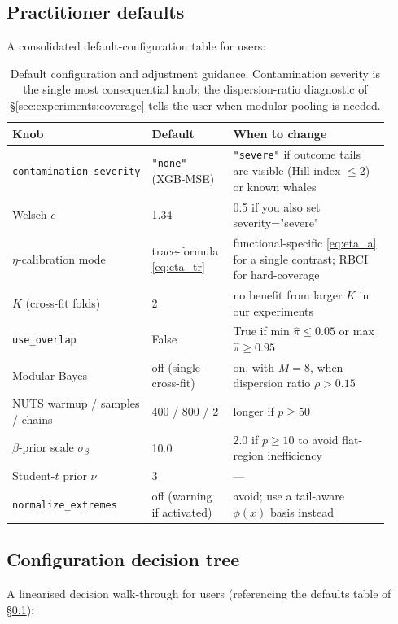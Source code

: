 \subsection{Practitioner defaults}
\label{sec:discussion:defaults}
A consolidated default-configuration table for users:

\begin{table}[!t]
\centering
\small
\begin{tabular}{p{0.27\linewidth}p{0.22\linewidth}p{0.43\linewidth}}
\toprule
Knob & Default & When to change \\
\midrule
\texttt{contamination\_severity} & \texttt{"none"} (XGB-MSE) & \texttt{"severe"} if outcome tails are visible (Hill index $\le 2$) or known whales \\
Welsch $c$ & 1.34 & 0.5 if you also set severity="severe" \\
$\eta$-calibration mode & trace-formula \eqref{eq:eta_tr} & functional-specific \eqref{eq:eta_a} for a single contrast; RBCI for hard-coverage \\
$K$ (cross-fit folds) & 2 & no benefit from larger $K$ in our experiments \\
\texttt{use\_overlap} & False & True if min $\hat\pi \le 0.05$ or max $\hat\pi \ge 0.95$ \\
Modular Bayes & off (single-cross-fit) & on, with $M = 8$, when dispersion ratio $\rho > 0.15$ \\
NUTS warmup / samples / chains & 400 / 800 / 2 & longer if $p \ge 50$ \\
$\beta$-prior scale $\sigma_\beta$ & 10.0 & 2.0 if $p \ge 10$ to avoid flat-region inefficiency \\
Student-$t$ prior $\nu$ & 3 & --- \\
\texttt{normalize\_extremes} & off (warning if activated) & avoid; use a tail-aware $\phi(x)$ basis instead \\
\bottomrule
\end{tabular}
\caption{Default configuration and adjustment guidance. Contamination
severity is the single most consequential knob; the dispersion-ratio
diagnostic of \S\ref{sec:experiments:coverage} tells the user
when modular pooling is needed.}
\label{tab:defaults}
\end{table}

\subsection{Configuration decision tree}
\label{sec:discussion:flowchart}
A linearised decision walk-through for users (referencing the
defaults table of \S\ref{sec:discussion:defaults}):


